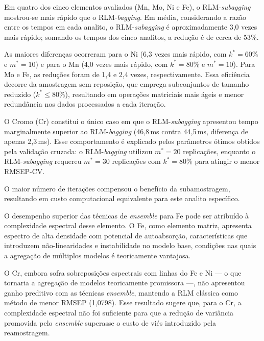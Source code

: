 Em quatro dos cinco elementos avaliados (Mn, Mo, Ni e Fe), o
RLM-\textit{subagging} mostrou-se mais rápido que o
RLM-\textit{bagging}. Em média, considerando a razão entre os tempos em cada analito, o
RLM-\textit{subagging} é aproximadamente 3,0 vezes mais rápido; somando os
tempos dos cinco analitos, a redução é de cerca de 53\%.

As maiores diferenças ocorreram
para o Ni (6,3 vezes mais rápido, com $k^*=60\%$ e $m^*=10$) e
para o Mn (4,0 vezes mais rápido, com $k^*=80\%$ e $m^*=10$).
Para Mo e Fe, as reduções foram de 1,4 e 2,4 vezes,
respectivamente. Essa eficiência decorre da amostragem sem
reposição, que emprega subconjuntos de tamanho reduzido
($k^* \leq 80\%$), resultando em operações matriciais mais ágeis
e menor redundância nos dados processados a cada iteração.

O Cromo (Cr) constitui o único caso em que o
RLM-\textit{subagging} apresentou tempo marginalmente superior ao
RLM-\textit{bagging} (46,8\,ms contra 44,5\,ms, diferença de
apenas 2,3\,ms). Esse comportamento é explicado pelos parâmetros
ótimos obtidos pela validação cruzada: o RLM-\textit{bagging}
utilizou $m^* = 20$ replicações, enquanto o RLM-\textit{subagging}
requereu $m^* = 30$ replicações com $k^* = 80\%$ para atingir o
menor \gls{RMSEP-CV}.

O maior número de iterações compensou o benefício
da subamostragem, resultando em custo computacional equivalente
para este analito específico.

O desempenho superior das técnicas de \textit{ensemble} para Fe pode ser 
atribuído à complexidade espectral desse elemento. O Fe, como elemento 
matriz, apresenta espectro de alta densidade com potencial de autoabsorção, 
características que introduzem não-linearidades e instabilidade no modelo 
base, condições nas quais a agregação de múltiplos modelos é teoricamente 
vantajosa.

O Cr, embora sofra sobreposições espectrais com linhas do Fe e 
Ni — o que tornaria a agregação de modelos teoricamente promissora —, não 
apresentou ganho preditivo com as técnicas \textit{ensemble}, mantendo a 
RLM clássica como método de menor RMSEP (1,0798). Esse resultado sugere 
que, para o Cr, a complexidade espectral não foi suficiente para que a 
redução de variância promovida pelo \textit{ensemble} superasse o custo 
de viés introduzido pela reamostragem.

